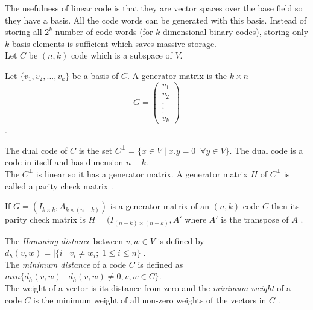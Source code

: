The usefulness of linear code is that they are vector spaces over the base field so they have a basis. All the code words can be generated with this basis. Instead of storing all \(2^k\) number of code words (for \(k\)-dimensional binary codes), storing only \(k\) basis elements is sufficient which saves massive storage.\\[2mm]
Let \(C\) be \((n,k)\) code which is a subspace of \(V\).

\begin{definition}
  Let \(\{v_1, v_2,...,v_k\}\) be a basis of \(C\). A generator matrix is the \(k \times n\)
  \[G=\begin{pmatrix}
      v_1\\
      v_2\\
      .\\
      .\\
      .\\
      v_k
    \end{pmatrix}
  \] \cite{error_correct}.
\end{definition}
\vspace{2mm}

\begin{definition}
  The dual code of \(C\) is the set \(C^{\perp}=\{x \in V \;| \; x.y=0 \;\; \forall y \in V \}\). The dual code is a code in itself and has dimension \(n-k\).\\
  The \(C^{\perp}\) is linear so it has a generator matrix. A generator matrix \(H\) of \(C^{\perp}\) is called a parity check matrix \cite{error_correct}.
\end{definition}

\begin{theorem}
  If \(G=(I_{k \times k},A_{k \times (n-k)})\) is a generator matrix of an \((n,k)\) code \(C\) then its parity check matrix is \(H=(I_{(n-k) \times (n-k)}, A'\) where \(A'\) is the transpose of \(A\) \cite{coding}.
\end{theorem}

\begin{definition}
  The \textit{Hamming distance} between \(v,w \in V\) is defined by \(d_h(v,w)=|\{i\;|\; v_i \neq w_i;\; 1 \leq i \leq n \}|\).\\
  The \textit{minimum distance} of a code \(C\) is defined as \(min\{d_h(v,w)\;|\; d_h(v,w) \neq 0, v,w \in C\}\).\\
  The weight of a vector is its distance from zero and the \textit{minimum weight} of a code \(C\) is the minimum weight of all non-zero weights of the vectors in \(C\) \cite{error_correct}.
\end{definition}

